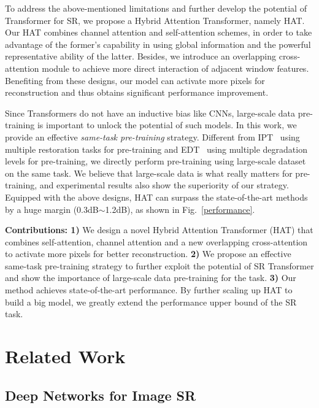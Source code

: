 \documentclass[10pt,twocolumn,letterpaper]{article}
\begin{document}
To address the above-mentioned limitations and further develop the potential of Transformer for SR, we propose a Hybrid Attention Transformer, namely HAT. Our HAT combines channel attention and self-attention schemes, in order to take advantage of the former's capability in using global information and the powerful representative ability of the latter. 
Besides, we introduce an overlapping cross-attention module to achieve more direct interaction of adjacent window features. Benefiting from these designs, our model can activate more pixels for reconstruction and thus obtains significant performance improvement.  

Since Transformers do not have an inductive bias like CNNs, large-scale data pre-training is important to unlock the potential of such models. 
In this work, we provide an effective \textit{same-task pre-training} strategy. Different from IPT~\cite{ipt} using multiple restoration tasks for pre-training and EDT~\cite{edt} using multiple degradation levels for pre-training, we directly perform pre-training using large-scale dataset on the same task. We believe that large-scale data is what really matters for pre-training, and experimental results also show the superiority of our strategy. Equipped with the above designs, HAT can surpass the state-of-the-art methods by a huge margin (0.3dB$\sim$1.2dB), as shown in Fig.~\ref{performance}. 











\textbf{Contributions: 1)} We design a novel Hybrid Attention Transformer (HAT) that combines self-attention, channel attention and a new overlapping cross-attention to activate more pixels for better reconstruction. \textbf{2)} We propose an effective same-task pre-training strategy to further exploit the potential of SR Transformer and show the importance of large-scale data pre-training for the task. \textbf{3)} Our method achieves state-of-the-art performance. By further scaling up HAT to build a big model, we greatly extend the performance upper bound of the SR task. 





\section{Related Work}

\subsection{Deep Networks for Image SR} 
\end{document}
